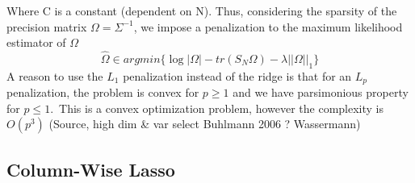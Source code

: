 Where C is a constant (dependent on N). Thus, considering the sparsity of the precision matrix $\Omega=\Sigma^{-1}$, we impose a penalization to the maximum likelihood estimator of $\Omega$
\begin{equation}
\hat\Omega\in argmin\big\{ \log|\Omega|-tr(S_N\Omega)-\lambda||\Omega||_1   \big\}
\end{equation}
A reason to use the $L_1$ penalization instead of the ridge is that for an $L_p$ penalization, the problem is convex for $p\geq 1$ and we have parsimonious property for $p\leq 1$.\
This is a convex optimization problem, however the complexity is $O(p^3)$ (Source, high dim \& var select Buhlmann 2006 ? Wassermann)

\subsection{Column-Wise Lasso}

